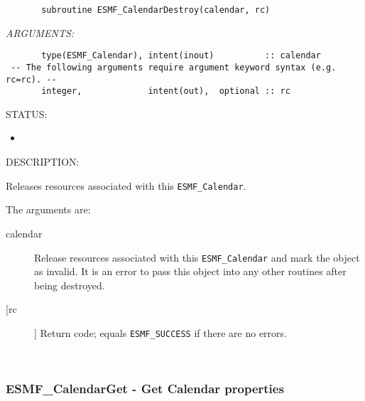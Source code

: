   
\begin{verbatim}       subroutine ESMF_CalendarDestroy(calendar, rc)\end{verbatim}{\em ARGUMENTS:}
\begin{verbatim}       type(ESMF_Calendar), intent(inout)          :: calendar
 -- The following arguments require argument keyword syntax (e.g. rc=rc). --
       integer,             intent(out),  optional :: rc\end{verbatim}
{\sf STATUS:}
   \begin{itemize}
   \item{}
   \end{itemize}
  
{\sf DESCRIPTION:\\ }


       Releases resources associated with this {\tt ESMF\_Calendar}.
  
       The arguments are:
       \begin{description}
       \item[calendar]
         Release resources associated with this {\tt ESMF\_Calendar} and mark the
         object as invalid.  It is an error to pass this object into any other
         routines after being destroyed.
       \item[[rc]]
         Return code; equals {\tt ESMF\_SUCCESS} if there are no errors.
       \end{description}
   
 
\mbox{}\hrulefill\ 
 
\subsubsection [ESMF\_CalendarGet] {ESMF\_CalendarGet - Get Calendar properties}


